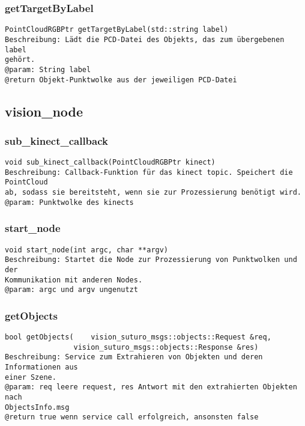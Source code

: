 \documentclass{suturo}
\begin{document}
\subsubsection{getTargetByLabel}
\begin{verbatim}
PointCloudRGBPtr getTargetByLabel(std::string label)
Beschreibung: Lädt die PCD-Datei des Objekts, das zum übergebenen label
gehört.
@param: String label
@return Objekt-Punktwolke aus der jeweiligen PCD-Datei
\end{verbatim}\label{func:gettargetbylabel}


\subsection*{vision\_node}
\subsubsection{sub\_kinect\_callback}
\begin{verbatim}
void sub_kinect_callback(PointCloudRGBPtr kinect)
Beschreibung: Callback-Funktion für das kinect topic. Speichert die PointCloud
ab, sodass sie bereitsteht, wenn sie zur Prozessierung benötigt wird.
@param: Punktwolke des kinects
\end{verbatim}\label{func:subkinectcallback}
\subsubsection{start\_node}
\begin{verbatim}
void start_node(int argc, char **argv)
Beschreibung: Startet die Node zur Prozessierung von Punktwolken und der
Kommunikation mit anderen Nodes.
@param: argc und argv ungenutzt
\end{verbatim}\label{func:startnode}
\subsubsection{getObjects}
\begin{verbatim}
bool getObjects(	vision_suturo_msgs::objects::Request &req, 
			    vision_suturo_msgs::objects::Response &res)
Beschreibung: Service zum Extrahieren von Objekten und deren Informationen aus
einer Szene.
@param: req leere request, res Antwort mit den extrahierten Objekten nach
ObjectsInfo.msg
@return true wenn service call erfolgreich, ansonsten false
\end{verbatim}\label{func:getobjects}
\end{document}
